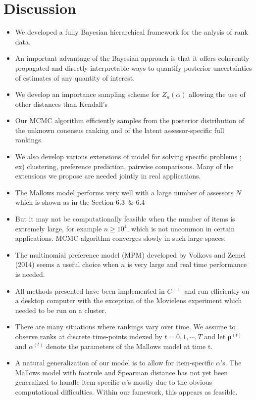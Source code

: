 \documentclass[12pt]{article}
\begin{document}
\section{Discussion}
\begin{itemize}
    \item We developed a fully Bayesian hierarchical framework for the anlysis of rank data. 
    \item An important advantage of the Bayesian approach is that it offers coherently propagated and directly interpretable ways to quantify posterior uncertainties of estimates of any quantity of interest. 
    \item We develop an importance sampling scheme for $Z_n(\alpha)$ allowing the use of other distances than Kendall's
    \item Our MCMC algorithm efficiently samples from the posterior distribution of the unknown conensus ranking and of the latent assessor-specific full rankings. 
    \item We also develop various extensions of model for solving specific problems ; ex) clustering, preference prediction, pairwise comparisons. Many of the extensions we propose are needed jointly in real applications.
    \item The Mallows model performs very well with a large number of assessors $N$ which is shown as in the Section 6.3 \,\& 6.4
    \item But it may not be computationally feasible when the number of items is extremely large, for example $n\geq 10^4$, which is not uncommon in certain applications. MCMC algorithm converges slowly in such large spaces. 
    \item The multinomial preference model (MPM) developed by Volkovs and Zemel (2014) seems a useful choice when $n$ is very large and real time performance is needed. 
    \item All methods presented have been implemented in $C^{++}$ and run efficiently on a desktop computer with the exception of the Movielens experiment which needed to be run on a cluster. 
    \item There are many situations where rankings vary over time. We assume to observe ranks at discrete time-points indexed by $t=0,1,\cdots, T$ and let $\boldsymbol{\rho}^{(t)}$ and $\alpha^{(t)}$ denote the parameters of the Mallows model at time t.
    \item A natural generalization of our model is to allow for item-specific $\alpha$'s. The Mallows model with footrule and Spearman distance has not yet been generalized to handle item specific $\alpha$'s mostly due to the obvious computational difficulties. Within our famework, this appears as feasible. 
\end{itemize}
\end{document}
